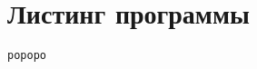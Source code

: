 \chapter{Листинг программы}
\label{cha:Листинг программы}


\begin{lstlisting}[caption=Файл name.cs]
ророро
\end{lstlisting}
%